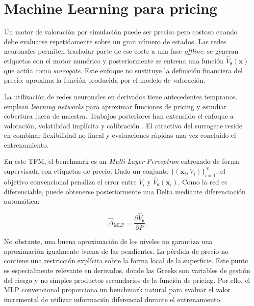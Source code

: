 \section{Machine Learning para pricing}
\label{sec:ml_pricing_literature}

Un motor de valoración por simulación puede ser preciso pero costoso cuando debe
evaluarse repetidamente sobre un gran número de estados. Las redes neuronales
permiten trasladar parte de ese coste a una fase \textit{offline}: se generan
etiquetas con el motor numérico y posteriormente se entrena una función
$\widehat V_{\theta}(\mathbf x)$ que actúa como \textit{surrogate}. Este enfoque no
sustituye la definición financiera del precio; aproxima la función producida por el
modelo de valoración.

La utilización de redes neuronales en derivados tiene antecedentes tempranos.
\textcite{hutchinson1994} emplean \textit{learning networks} para aproximar
funciones de pricing y estudiar cobertura fuera de muestra. Trabajos posteriores
han extendido el enfoque a valoración, volatilidad implícita y calibración
\cite{rufwang2020,liu2019optionpricing,horvath2021deeplearningvolatility}.
El atractivo del surrogate reside en combinar flexibilidad no lineal y evaluaciones
rápidas una vez concluido el entrenamiento.

En este TFM, el benchmark es un \textit{Multi-Layer Perceptron} entrenado de forma
supervisada con etiquetas de precio. Dado un conjunto
$\{(\mathbf x_i,V_i)\}_{i=1}^{N}$, el objetivo convencional penaliza el error entre
$V_i$ y $\widehat V_\theta(\mathbf x_i)$. Como la red es diferenciable, puede
obtenerse posteriormente una Delta mediante diferenciación automática:

\begin{equation}
    \widehat{\Delta}_{\mathrm{MLP}}
    =
    \frac{\partial \widehat V_\theta}{\partial P}.
    \label{eq:mlp_derived_delta}
\end{equation}

No obstante, una buena aproximación de los niveles no garantiza una aproximación
igualmente buena de las pendientes. La pérdida de precio no contiene una
restricción explícita sobre la forma local de la superficie. Este punto es
especialmente relevante en derivados, donde las Greeks son variables de gestión
del riesgo y no simples productos secundarios de la función de pricing. Por ello,
el MLP convencional proporciona un benchmark natural para evaluar el valor
incremental de utilizar información diferencial durante el entrenamiento.

